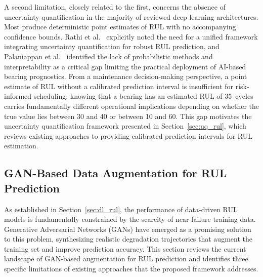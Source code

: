 \documentclass[review]{elsarticle}
\begin{document}
A second limitation, closely related to the first, concerns the
absence of uncertainty quantification in the majority of reviewed deep
learning architectures. Most produce deterministic point estimates of
RUL with no accompanying confidence bounds.
Rathi et al.~\cite{rathi2026reliability} explicitly noted the need
for a unified framework integrating uncertainty quantification for
robust RUL prediction, and
Palaniappan et al.~\cite{palaniappan_systematic_2026} identified the
lack of probabilistic methods and interpretability as a critical gap
limiting the practical deployment of AI-based bearing prognostics.
From a maintenance decision-making perspective, a point estimate of
RUL without a calibrated prediction interval is insufficient for
risk-informed scheduling: knowing that a bearing has an estimated
RUL of 35~cycles carries fundamentally different operational
implications depending on whether the true value lies between 30 and
40 or between 10 and 60. This gap motivates the uncertainty quantification
framework presented in Section~\ref{sec:uq_rul}, which
reviews existing approaches to providing calibrated prediction
intervals for RUL estimation.



\subsection{GAN-Based Data Augmentation for RUL Prediction}
\label{sec:gan_augmentation}

As established in Section~\ref{sec:dl_rul}, the performance of
data-driven RUL models is fundamentally constrained by the scarcity
of near-failure training data. Generative Adversarial Networks (GANs)
have emerged as a promising solution to this problem, synthesizing
realistic degradation trajectories that augment the training set and
improve prediction accuracy. This section reviews the current
landscape of GAN-based augmentation for RUL prediction and identifies
three specific limitations of existing approaches that the proposed
framework addresses.\\
\end{document}
